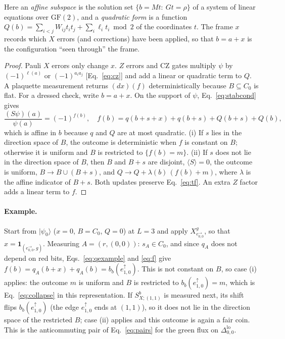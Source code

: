 \documentclass[a4paper]{article}
\newcommand{\rd}{r}
\newcommand{\gr}{g}
\newcommand{\bl}{b}
\newcommand{\GF}{\mathrm{GF}(2)}
\providecommand{\ket}[1]{\ensuremath{|#1\rangle}}
\newcommand{\eh}[1]{e^{\rightarrow}_{#1}}   %
\newcommand{\ev}[1]{e^{\uparrow}_{#1}}      %
\newcommand{\tlo}[1]{\Delta^{\mathrm{lo}}_{#1}}
\begin{document}
Here an \emph{affine subspace} is the solution set $\{b=Mt:\ Gt=\rho\}$ of a system of linear equations over $\GF$, and a \emph{quadratic form} is a function $Q(b)=\sum_{i<j}W_{ij}t_it_j+\sum_i\ell_it_i\bmod2$ of the coordinates $t$. The frame $x$ records which $X$ errors (and corrections) have been applied, so that $b=a+x$ is the configuration ``seen through'' the frame.

\begin{proof}
Pauli $X$ errors only change $x$. $Z$ errors and CZ gates multiply $\psi$ by $(-1)^{\ell(a)}$ or $(-1)^{a_ia_j}$ [Eq.~\eqref{eq:cz}] and add a linear or quadratic term to $Q$. A plaquette measurement returns $(dx)(f)$ deterministically because $B\subseteq C_0$ is flat. For a dressed check, write $b=a+x$. On the support of $\psi$, Eq.~\eqref{eq:stabcond} gives
\begin{equation}
  \frac{(S\psi)(a)}{\psi(a)}=(-1)^{f(b)},\quad f(b)=q(b+s+x)+q(b+s)+Q(b+s)+Q(b),
  \label{eq:f}
\end{equation}
which is affine in $b$ because $q$ and $Q$ are at most quadratic. (i) If $s$ lies in the direction space of $B$, the outcome is deterministic when $f$ is constant on $B$; otherwise it is uniform and $B$ is restricted to $\{f(b)=m\}$. (ii) If $s$ does not lie in the direction space of $B$, then $B$ and $B+s$ are disjoint, $\langle S\rangle=0$, the outcome is uniform, $B\to B\cup(B+s)$, and $Q\to Q+\lambda(b)\,(f(b)+m)$, where $\lambda$ is the affine indicator of $B+s$. Both updates preserve Eq.~\eqref{eq:tf}. An extra $Z$ factor adds a linear term to $f$.
\end{proof}

\paragraph{Example.}
Start from $\ket{\psi_0}$ ($x=0$, $B=C_0$, $Q=0$) at $L=3$ and apply $X^\gr_{\eh{0,0}}$, so that $x=\mathbf 1_{(\eh{0,0},\gr)}$. Measuring $A=(\rd,(0,0))$: $s_A\in C_0$, and since $q_A$ does not depend on red bits, Eqs.~\eqref{eq:qexample} and \eqref{eq:f} give $f(b)=q_A(b+x)+q_A(b)=b_\bl(\ev{1,0})$. This is not constant on $B$, so case (i) applies: the outcome $m$ is uniform and $B$ is restricted to $b_\bl(\ev{1,0})=m$, which is Eq.~\eqref{eq:collapse} in this representation. If $S^\bl_{X;(1,1)}$ is measured next, its shift flips $b_\bl(\ev{1,0})$ (the edge $\ev{1,0}$ ends at $(1,1)$), so it does not lie in the direction space of the restricted $B$; case (ii) applies and this outcome is again a fair coin. This is the anticommuting pair of Eq.~\eqref{eq:pairs} for the green flux on $\tlo{0,0}$.
\end{document}

